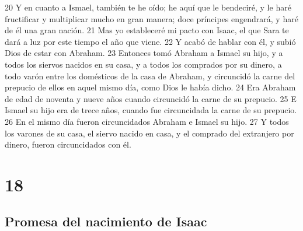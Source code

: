20 Y en cuanto a Ismael, también te he oído; he aquí que le bendeciré, y le haré fructificar y multiplicar mucho en gran manera; doce príncipes engendrará, y haré de él una gran nación.
21 Mas yo estableceré mi pacto con Isaac, el que Sara te dará a luz por este tiempo el año que viene.
22 Y acabó de hablar con él, y subió Dios de estar con Abraham.
23 Entonces tomó Abraham a Ismael su hijo, y a todos los siervos nacidos en su casa, y a todos los comprados por su dinero, a todo varón entre los domésticos de la casa de Abraham, y circuncidó la carne del prepucio de ellos en aquel mismo día, como Dios le había dicho.
24 Era Abraham de edad de noventa y nueve años cuando circuncidó la carne de su prepucio.
25 E Ismael su hijo era de trece años, cuando fue circuncidada la carne de su prepucio.
26 En el mismo día fueron circuncidados Abraham e Ismael su hijo.
27 Y todos los varones de su casa, el siervo nacido en casa, y el comprado del extranjero por dinero, fueron circuncidados con él.

\chapter{18}

\section{Promesa del nacimiento de Isaac}

